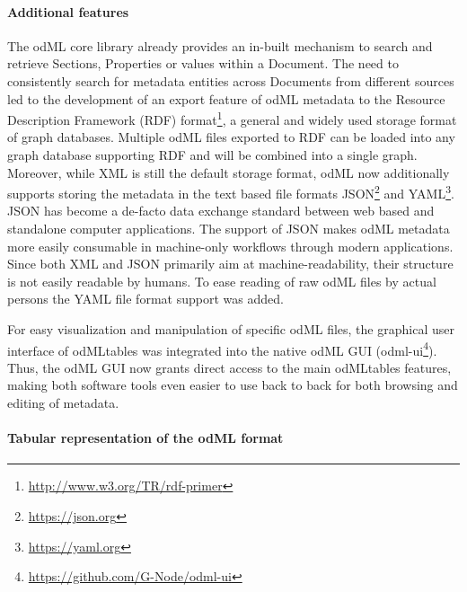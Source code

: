 \paragraph{Additional features}
The odML core library already provides an in-built mechanism to search and retrieve Sections, Properties or values within a Document. The need to consistently search for metadata entities across Documents from different sources led to the development of an export feature of odML metadata to the Resource Description Framework (RDF) format\footnote{\url{http://www.w3.org/TR/rdf-primer}}, a general and widely used storage format of graph databases. Multiple odML files exported to RDF can be loaded into any graph database supporting RDF and will be combined into a single graph. Moreover, while XML is still the default storage format, odML now additionally supports storing the metadata in the text based file formats JSON\footnote{\url{https://json.org}} and YAML\footnote{\url{https://yaml.org}}. JSON has become a de-facto data exchange standard between web based and standalone computer applications. The support of JSON makes odML metadata more easily consumable in machine-only workflows through modern applications. Since both XML and JSON primarily aim at machine-readability, their structure is not easily readable by humans. To ease reading of raw odML files by actual persons the YAML file format support was added.

For easy visualization and manipulation of specific odML files, the graphical user interface of odMLtables was integrated into the native odML GUI (odml-ui\footnote{\url{https://github.com/G-Node/odml-ui}}). Thus, the odML GUI now grants direct access to the main odMLtables features, making both software tools even easier to use back to back for both browsing and editing of metadata.

\paragraph{Tabular representation of the odML format} 
\label{sec:tabular_format}

